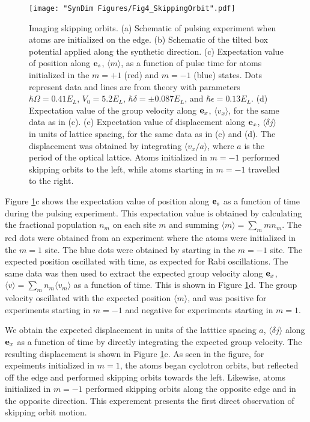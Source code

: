 \begin{figure}
	\texttt{[image: "SynDim Figures/Fig4\_SkippingOrbit".pdf]}
\caption{Imaging skipping orbits. (a) Schematic of pulsing experiment when atoms are initialized on the edge. (b) Schematic of the tilted box potential applied along the synthetic direction. (c) Expectation value of position along ${\bf e}_s$, $\langle m \rangle$, as a function of pulse time for atoms initialized in the $m=+1$ (red) and $m=-1$ (blue) states. Dots represent data and lines are from theory with parameters $\hbar\Omega=0.41 E_L$, $V_0=5.2 E_L$, $\hbar\delta=\pm0.087 E_L$, and $\hbar\epsilon=0.13 E_L$. (d) Expectation value of the group velocity along ${\bf e}_x$, $\langle v_x\rangle$, for the same data as in (c). (e) Expectation value of displacement along ${\bf e}_x$,  $\langle \delta j \rangle$ in units of lattice spacing, for the same data as in (c) and (d). The displacement was obtained by integrating $\langle v_x/a \rangle$, where $a$ is the period of the optical lattice. Atoms initialized in $m=-1$ performed skipping orbits to the left, while atoms starting in $m=-1$ travelled to the right.  }
\label{fig:skippingOrbits}
\end{figure}

Figure \ref{fig:skippingOrbits}c shows the expectation value of position along ${\bf e}_s$ as a function of time during the pulsing experiment. This expectation value is obtained by calculating the fractional population $n_m$ on each site $m$ and summing $\langle m\rangle = \sum_m m n_m$. The red dots were obtained from an experiment  where the atoms were initialized in the $m=1$ site. The blue dots were obtained by starting in the $m=-1$ site. The expected position oscillated with time, as expected for Rabi oscillations. The same data was then used to extract the expected group velocity along ${\bf e}_x$, $\langle v \rangle = \sum_m n_m \langle v_m \rangle$ as a function of time. This is shown in Figure \ref{fig:skippingOrbits}d. The group velocity oscillated with the expected position $\langle m \rangle$, and was positive for experiments starting in $m=-1$ and negative for experiments starting in $m=1$. 

We obtain the expected displacement in units of the latttice spacing $a$, $\langle \delta j \rangle$ along ${\bf e}_x$ as a function of time by directly integrating the expected group velocity. The resulting displacement is shown in Figure \ref{fig:skippingOrbits}e. As seen in the figure, for expeiments initialized in $m=1$, the atoms began cyclotron orbits, but reflected off the edge and performed skipping orbits towards the left. Likewise, atoms initialized in $m=-1$ performed skipping orbits along the opposite edge and in the opposite direction. This experement presents the first direct observation of skipping orbit motion. 
